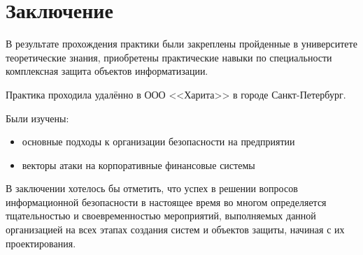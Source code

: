 \chapter{Заключение}

В результате прохождения практики были закреплены пройденные в университете теоретические знания, приобретены практические навыки по специальности комплексная защита объектов информатизации.

Практика проходила удалённо в ООО <<Харита>>  в городе Санкт-Петербург.

Были изучены:
\begin{itemize}
	\item основные подходы к организации безопасности на предприятии
	\item векторы атаки на корпоративные финансовые системы
\end{itemize}

В заключении хотелось бы отметить, что успех в решении вопросов информационной безопасности в настоящее время во многом определяется тщательностью и своевременностью мероприятий, выполняемых данной организацией на всех этапах создания систем и объектов защиты, начиная с их проектирования.

